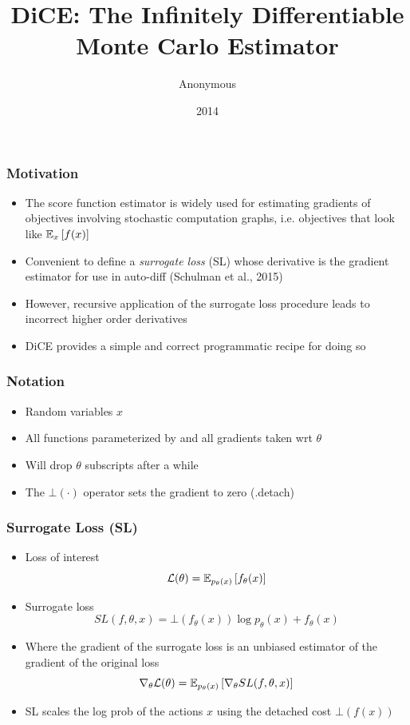 \documentclass{beamer}
\title{DiCE: The Infinitely Differentiable Monte Carlo Estimator}
\author{Anonymous}
\institute{Overleaf}
\date{2014}
\begin{document}
 
\frame{\titlepage}
 
\begin{frame}
\frametitle{Motivation}
\begin{itemize}
\item The score function estimator is widely used for estimating gradients of
objectives involving stochastic computation graphs, i.e. objectives that look like $\mathbb{E}_{x}\left[f(x)\right]$
\item Convenient to define a \textit{surrogate loss} (SL)
whose derivative is the gradient estimator for use in auto-diff (Schulman et al., 2015) 
\item However, recursive application of the surrogate loss procedure leads to incorrect
higher order derivatives
\item DiCE provides a simple and correct programmatic recipe for doing so
\end{itemize}
\end{frame}

\begin{frame}
\frametitle{Notation}
\begin{itemize}
\item Random variables $x$
\item All functions parameterized by and all gradients taken wrt $\theta$
\item Will drop $\theta$ subscripts after a while
\item The $\bot(\cdot)$ operator sets the gradient to zero (.detach)
\end{itemize}
\end{frame}

\begin{frame}
\frametitle{Surrogate Loss (SL)}
\begin{itemize}
\item Loss of interest 
$$\mathcal{L}(\theta) = \mathbb{E}_{p_\theta(x)}\left[f_\theta(x)\right]$$
\item Surrogate loss
$$SL(f, \theta, x) = \bot(f_\theta(x))\log p_\theta(x) + f_\theta(x)$$
\item Where the gradient of the surrogate loss is an unbiased estimator of the gradient of 
the original loss
$$\nabla_\theta \mathcal{L}(\theta) = \mathbb{E}_{p_\theta(x)}\left[\nabla_\theta SL(f, \theta, x)\right]$$
\item SL scales the log prob of the actions $x$
using the detached cost $\bot(f(x))$ 
\end{itemize}
\end{frame}
\end{document}
